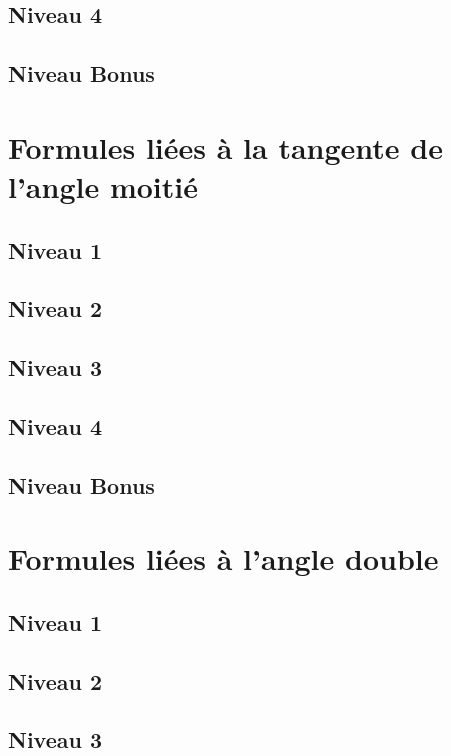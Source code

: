 \documentclass[a4paper]{report}
\begin{document}
			\subsection{Niveau 4}
			
			\subsection{Niveau Bonus}
		
		\section{Formules liées à la tangente de l'angle moitié}
		
			\subsection{Niveau 1}
		
			\subsection{Niveau 2}
		
			\subsection{Niveau 3}
			
			\subsection{Niveau 4}
			
			\subsection{Niveau Bonus}
		
		\section{Formules liées à l'angle double}
		
			\subsection{Niveau 1}
		
			\subsection{Niveau 2}
		
			\subsection{Niveau 3}
			
\end{document}
